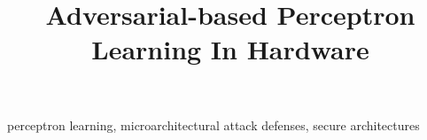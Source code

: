 \documentclass[conference]{IEEEtran}
\begin{document}
\title{Adversarial-based Perceptron Learning In Hardware \\

}




\maketitle

\begin{IEEEkeywords}
perceptron learning, microarchitectural attack defenses, secure architectures
\end{IEEEkeywords}












\end{document}
